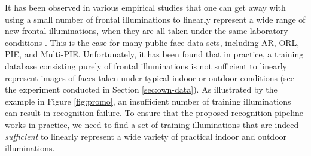 It has been observed in various empirical studies that one can get away with
using a small number of frontal illuminations to linearly represent a wide
range of new frontal illuminations, when they are all taken under the same
laboratory conditions \cite{Georghiades2001-PAMI}. This is the case for many
public face data sets, including AR, ORL, PIE, and Multi-PIE.  Unfortunately, it
has been found that in practice, a training database consisting purely of
frontal illuminations is not sufficient to linearly represent images of faces
taken under typical indoor or outdoor conditions (see the experiment conducted
in Section \ref{sec:own-data}). As illustrated by the example in Figure
\ref{fig:promo}, an insufficient number of training illuminations can result in
recognition failure. To ensure that the proposed recognition pipeline works in
practice, we need to find a set of training illuminations that are indeed {\em
sufficient} to linearly represent a wide variety of practical indoor and
outdoor illuminations.

